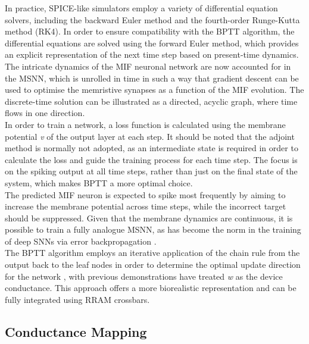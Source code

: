 \noindent In practice, SPICE-like simulators employ a variety of differential equation solvers, including the backward Euler method and the fourth-order Runge-Kutta method (RK4). In order to ensure compatibility with the BPTT algorithm, the differential equations are solved using the forward Euler method, which provides an explicit representation of the next time step based on present-time dynamics. \\

\noindent The intricate dynamics of the MIF neuronal network are now accounted for in the MSNN, which is unrolled in time in such a way that gradient descent can be used to optimise the memristive synapses as a function of the MIF evolution. The discrete-time solution can be illustrated as a directed, acyclic graph, where time flows in one direction. \\

\noindent In order to train a network, a loss function is calculated using the membrane potential \textit{v} of the output layer at each step. It should be noted that the adjoint method \cite{chen2018neural} is normally not adopted, as an intermediate state is required in order to calculate the loss and guide the training process for each time step. The focus is on the spiking output at all time steps, rather than just on the final state of the system, which makes BPTT a more optimal choice.\\

\noindent The predicted MIF neuron is expected to spike most frequently by aiming to increase the membrane potential across time steps, while the incorrect target should be suppressed. Given that the membrane dynamics are continuous, it is possible to train a fully analogue MSNN, as has become the norm in the training of deep SNNs via error backpropagation \cite{neftci2019surrogate}.\\

\noindent The BPTT algorithm employs an iterative application of the chain rule from the output back to the leaf nodes in order to determine the optimal update direction for the network \cite{eshraghian2023training}, with previous demonstrations have treated \textit{w} as the device conductance. This approach offers a more biorealistic representation and can be fully integrated using RRAM crossbars.

\subsection[Conductance Mapping]{Conductance Mapping}


